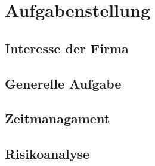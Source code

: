 \chapter{Aufgabenstellung}
\section{Interesse der Firma}
\section{Generelle Aufgabe}
\section{Zeitmanagament}
\section{Risikoanalyse}